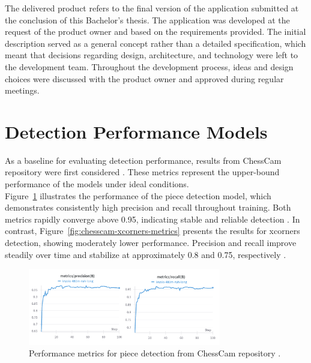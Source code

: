 The delivered product refers to the final version of the application submitted at the conclusion of this Bachelor’s thesis. The application was developed at the request of the product owner and based on the requirements provided. The initial description served as a general concept rather than a detailed specification, which meant that decisions regarding design, architecture, and technology were left to the development team. Throughout the development process, ideas and design choices were discussed with the product owner and approved during regular meetings.

\section{Detection Performance Models}
\label{chesscam-metrics}
As a baseline for evaluating detection performance, results from ChessCam repository were first considered \cite{github:chesscam}. These metrics represent the upper-bound performance of the models under ideal conditions. \\

Figure~\ref{fig:chesscam-piece-metrics} illustrates the performance of the piece detection model, which demonstrates consistently high precision and recall throughout training. Both metrics rapidly converge above 0.95, indicating stable and reliable detection \cite{wandb:piece-detection}. In contrast, Figure~\ref{fig:chesscam-xcorners-metrics} presents the results for xcorners detection, showing moderately lower performance. Precision and recall improve steadily over time and stabilize at approximately 0.8 and 0.75, respectively \cite{wandb:xcorner-detection}. \\

\begin{figure}[H]
\centering
\includegraphics[width=0.75\textwidth]{figures/results/machine-learning/piece-metrics.png}
\caption[Performance piece detection (ChessCam)]{Performance metrics for piece detection from ChessCam repository \cite{wandb:piece-detection}.}
\label{fig:chesscam-piece-metrics}
\end{figure}

